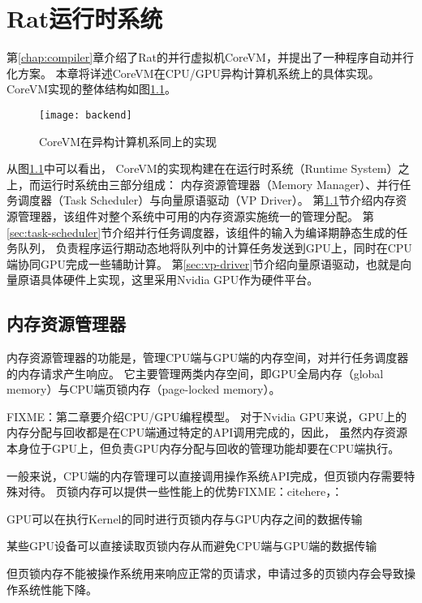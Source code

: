 \chapter{Rat运行时系统}

第\ref{chap:compiler}章介绍了Rat的并行虚拟机CoreVM，并提出了一种程序自动并行化方案。
本章将详述CoreVM在CPU/GPU异构计算机系统上的具体实现。
CoreVM实现的整体结构如图\ref{fig:backend}。
\begin{figure}
  \centering
  \texttt{[image: backend]}
  \caption{CoreVM在异构计算机系同上的实现}
  \label{fig:backend}
\end{figure}

从图\ref{fig:backend}中可以看出，
CoreVM的实现构建在在运行时系统（Runtime System）之上，而运行时系统由三部分组成：
内存资源管理器（Memory Manager）、并行任务调度器（Task Scheduler）与向量原语驱动（VP Driver）。
第\ref{sec:memory-manager}节介绍内存资源管理器，该组件对整个系统中可用的内存资源实施统一的管理分配。
第\ref{sec:task-scheduler}节介绍并行任务调度器，该组件的输入为编译期静态生成的任务队列，
负责程序运行期动态地将队列中的计算任务发送到GPU上，同时在CPU端协同GPU完成一些辅助计算。
第\ref{sec:vp-driver}节介绍向量原语驱动，也就是向量原语具体硬件上实现，这里采用Nvidia GPU作为硬件平台。

\section{内存资源管理器}\label{sec:memory-manager}
内存资源管理器的功能是，管理CPU端与GPU端的内存空间，对并行任务调度器的内存请求产生响应。
它主要管理两类内存空间，即GPU全局内存（global memory）与CPU端页锁内存（page-locked memory）。

FIXME：第二章要介绍CPU/GPU编程模型。
对于Nvidia GPU来说，GPU上的内存分配与回收都是在CPU端通过特定的API调用完成的，因此，
虽然内存资源本身位于GPU上，但负责GPU内存分配与回收的管理功能却要在CPU端执行。

一般来说，CPU端的内存管理可以直接调用操作系统API完成，但页锁内存需要特殊对待。
页锁内存可以提供一些性能上的优势FIXME：citehere，：
\begin{compactitem}
  \item GPU可以在执行Kernel的同时进行页锁内存与GPU内存之间的数据传输
  \item 某些GPU设备可以直接读取页锁内存从而避免CPU端与GPU端的数据传输
\end{compactitem}
但页锁内存不能被操作系统用来响应正常的页请求，申请过多的页锁内存会导致操作系统性能下降。

